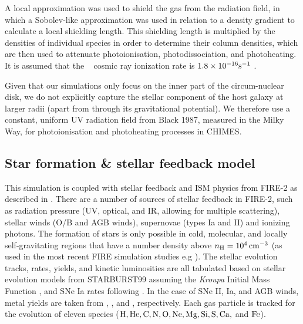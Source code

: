 \documentclass[fleqn,usenatbib]{mnras}
\newcommand{\nh}{n_{\rm H}}
\newcommand{\HI}{\ion{H}{i}}
\begin{document}
A local approximation was used to shield the gas from the radiation field, in which a Sobolev-like approximation was used in relation to a density gradient to calculate a local shielding length. This shielding length is multiplied by the densities of individual species in order to determine their column densities, which are then used to attenuate photoionisation, photodissociation, and photoheating. It is assumed that the \HI~ cosmic ray ionization rate is $1.8 \times 10^{-16} \rm s^{-1}$ \citep{Indriolo2012}.

Given that our simulations only focus on the inner part of the circum-nuclear disk, we do not explicitly capture the stellar component of the host galaxy at larger radii (apart from through its gravitational potential). We therefore use a constant, uniform UV radiation field from Black 1987, measured in the Milky Way, for photoionisation and photoheating processes in \textsc{CHIMES}. 

\subsection{Star formation \& stellar feedback model}\label{sec:SFR}

This simulation is coupled with stellar feedback and ISM physics from FIRE-2 as described in \cite{Hopkins2018a}. There are a number of sources of stellar feedback in FIRE-2, such as radiation pressure (UV, optical, and IR, allowing for multiple scattering), stellar winds (O/B and AGB winds), supernovae (types Ia and II) and ionizing photons. 
The formation of stars is only possible in cold, molecular, and locally self-gravitating regions that have a number density above $\nh = 10^4 \, {\rm cm}^{-3}$ (as used in the most recent FIRE simulation studies e.g \citep{Torrey2020}).
The stellar evolution tracks, rates, yields, and kinetic luminosities are all tabulated based on stellar evolution models from STARBURST99 \citep{Leitherer1999} assuming the \textit{Kroupa} Initial Mass Function \citep[IMF;][]{Kroupa2002}, and  SNe Ia rates following \citet{Mannucci2006}. In the case of SNe II, Ia, and AGB winds, metal yields are taken from \citet{Nomoto2006}, \citet{Iwamoto1999}, and \citet{Izzard2004}, respectively. Each gas particle is tracked for the evolution of eleven species ($\rm H, He, C, N, O, Ne, Mg, Si, S, Ca,$ and $\rm Fe$). 
\end{document}
